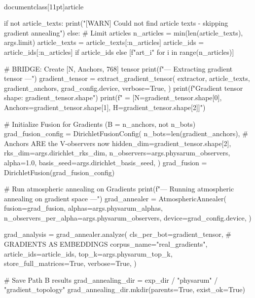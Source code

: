 \\documentclass[11pt]{article}
\begin{document}
\begin{CodeBlock}
            if not article_texts:
                print("[WARN] Could not find article texts - skipping gradient annealing")
            else:
                # Limit articles
                n_articles = min(len(article_texts), args.limit)
                article_texts = article_texts[:n_articles]
                article_ids = article_ids[:n_articles] if article_ids else [f"art_{i}" for i in range(n_articles)]
                
                # BRIDGE: Create [N, Anchors, 768] tensor
                print(f"\n--- Extracting gradient tensor ---")
                gradient_tensor = extract_gradient_tensor(
                    extractor,
                    article_texts,
                    gradient_anchors,
                    grad_config.device,
                    verbose=True,
                )
                print(f"Gradient tensor shape: {gradient_tensor.shape}")
                print(f"  = [N={gradient_tensor.shape[0]}, Anchors={gradient_tensor.shape[1]}, H={gradient_tensor.shape[2]}]")
                
                # Initialize Fusion for Gradients (B = n_anchors, not n_bots)
                grad_fusion_config = DirichletFusionConfig(
                    n_bots=len(gradient_anchors),  # Anchors ARE the V-observers now
                    hidden_dim=gradient_tensor.shape[2],
                    rks_dim=args.dirichlet_rks_dim,
                    n_observers=args.physarum_observers,
                    alpha=1.0,
                    basis_seed=args.dirichlet_basis_seed,
                )
                grad_fusion = DirichletFusion(grad_fusion_config)

                # Run atmospheric annealing on Gradients
                print(f"\n--- Running atmospheric annealing on gradient space ---")
                grad_annealer = AtmosphericAnnealer(
                    fusion=grad_fusion,
                    alphas=args.physarum_alphas,
                    n_observers_per_alpha=args.physarum_observers,
                    device=grad_config.device,
                )

                grad_analysis = grad_annealer.analyze(
                    cls_per_bot=gradient_tensor,  # GRADIENTS AS EMBEDDINGS
                    corpus_name="real_gradients",
                    article_ids=article_ids,
                    top_k=args.physarum_top_k,
                    store_full_matrices=True,
                    verbose=True,
                )

                # Save Path B results
                grad_annealing_dir = exp_dir / "physarum" / "gradient_topology"
                grad_annealing_dir.mkdir(parents=True, exist_ok=True)


\end{CodeBlock}
\end{document}
